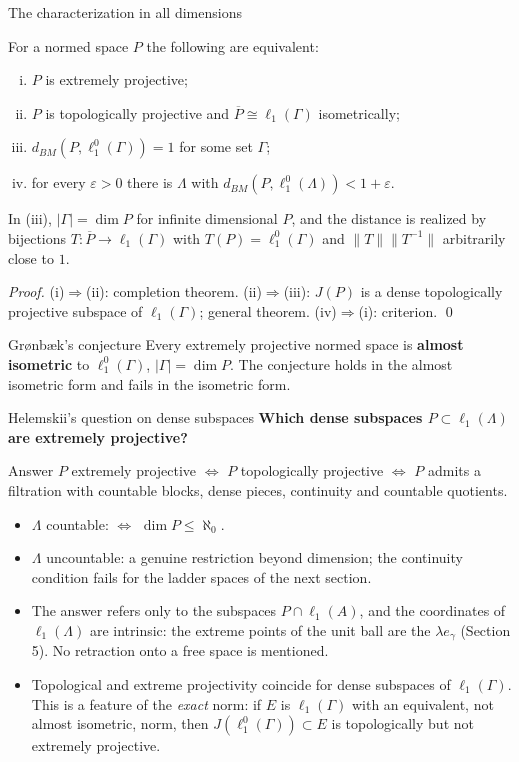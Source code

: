 \documentclass[10pt,aspectratio=169]{beamer}
\newcommand{\lo}[1]{\ell_1^0(#1)}
\newcommand{\ellone}[1]{\ell_1(#1)}
\newcommand{\BM}{d_{BM}}
\begin{document}
\begin{frame}{The characterization in all dimensions}
  \begin{theorem}
    For a normed space $P$ the following are equivalent:
    \begin{enumerate}[(i)]
      \item $P$ is extremely projective;
      \item $P$ is topologically projective and $\overline P\cong\ellone\Gamma$ isometrically;
      \item $\BM(P,\lo\Gamma)=1$ for some set $\Gamma$;
      \item for every $\varepsilon>0$ there is $\Lambda$ with $\BM(P,\lo\Lambda)<1+\varepsilon$.
    \end{enumerate}
    In (iii), $|\Gamma|=\dim P$ for infinite dimensional $P$, and the distance is
    realized by bijections $T\colon\overline P\to\ellone\Gamma$ with $T(P)=\lo\Gamma$
    and $\|T\|\|T^{-1}\|$ arbitrarily close to $1$.
  \end{theorem}
  \textit{Proof.} (i)$\Rightarrow$(ii): completion theorem. (ii)$\Rightarrow$(iii):
  $J(P)$ is a dense topologically projective subspace of $\ellone\Gamma$; general
  theorem. (iv)$\Rightarrow$(i): criterion. \qed
  \begin{alertblock}{Gr{\o}nb{\ae}k's conjecture}
    Every extremely projective normed space is \textbf{almost isometric} to
    $\lo\Gamma$, $|\Gamma|=\dim P$. The conjecture holds in the almost isometric
    form and fails in the isometric form.
  \end{alertblock}
\end{frame}

\begin{frame}{Helemskii's question on dense subspaces}
  \textbf{Which dense subspaces $P\subset\ellone\Lambda$ are extremely projective?}
  \begin{block}{Answer}
    $P$ extremely projective $\iff$ $P$ topologically projective $\iff$ $P$ admits
    a filtration with countable blocks, dense pieces, continuity and countable
    quotients.
  \end{block}
  \begin{itemize}
    \item $\Lambda$ countable: $\iff$ $\dim P\le\aleph_0$.
    \item $\Lambda$ uncountable: a genuine restriction beyond dimension; the
      continuity condition fails for the ladder spaces of the next section.
    \item The answer refers only to the subspaces $P\cap\ellone A$, and the
      coordinates of $\ellone\Lambda$ are intrinsic: the extreme points of the
      unit ball are the $\lambda e_\gamma$ (Section 5). No retraction onto a
      free space is mentioned.
    \item Topological and extreme projectivity coincide for dense subspaces of
      $\ellone\Gamma$. This is a feature of the \emph{exact} norm: if $E$ is
      $\ellone\Gamma$ with an equivalent, not almost isometric, norm, then
      $J(\lo\Gamma)\subset E$ is topologically but not extremely projective.
  \end{itemize}
\end{frame}
\end{document}
